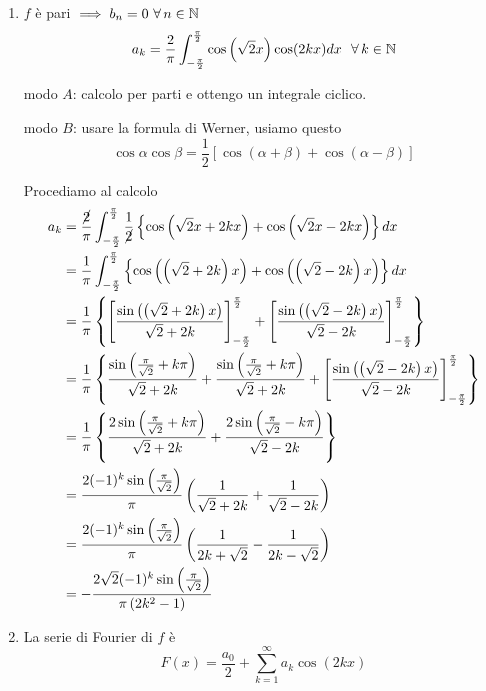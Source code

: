 \begin{enumerate}
\item $f$ è pari $\implies b_{n} = 0\ \forall n\in \NN $
\begin{equation*}
a_{k} = \frac{2}{\pi}\int^{\frac{\pi}{2}}_{- \frac{\pi}{2}}\cos\left(\sqrt{2} x\right)\cos(2kx) dx\ \ \forall k\in \NN 
\end{equation*}

modo $A$: calcolo per parti e ottengo un integrale ciclico.

modo $B$: usare la formula di Werner, usiamo questo
\begin{equation*}
\cos \alpha \cos \beta = \frac{1}{2}[\cos(\alpha + \beta) + \cos(\alpha - \beta)]
\end{equation*}

Procediamo al calcolo
\begin{align*}
a_{k} & = \frac{\cancel{2}}{\pi}\int^{\frac{\pi}{2}}_{- \frac{\pi}{2}}\frac{1}{\cancel{2}}\left\{\cos\left(\sqrt{2} x + 2kx\right) + \cos\left(\sqrt{2} x - 2kx\right)\right\} dx\\
 & = \frac{1}{\pi}\int^{\frac{\pi}{2}}_{- \frac{\pi}{2}}\left\{\cos\left(\left(\sqrt{2} + 2k\right) x\right) + \cos\left(\left(\sqrt{2} - 2k\right) x\right)\right\} dx\\
 & = \frac{1}{\pi}\left\{\left[\frac{\sin\left(\left(\sqrt{2} + 2k\right) x\right)}{\sqrt{2} + 2k}\right]^{\frac{\pi}{2}}_{- \frac{\pi}{2}} + \left[\frac{\sin\left(\left(\sqrt{2} - 2k\right) x\right)}{\sqrt{2} - 2k}\right]^{\frac{\pi}{2}}_{- \frac{\pi}{2}}\right\}\\
 & = \frac{1}{\pi}\left\{\frac{\sin\left(\frac{\pi}{\sqrt{2}} + k\pi \right)}{\sqrt{2} + 2k} + \frac{\sin\left(\frac{\pi}{\sqrt{2}} + k\pi \right)}{\sqrt{2} + 2k} + \left[\frac{\sin\left(\left(\sqrt{2} - 2k\right) x\right)}{\sqrt{2} - 2k}\right]^{\frac{\pi}{2}}_{- \frac{\pi}{2}}\right\}\\
 & = \frac{1}{\pi}\left\{\frac{2\sin\left(\frac{\pi}{\sqrt{2}} + k\pi \right)}{\sqrt{2} + 2k} + \frac{2\sin\left(\frac{\pi}{\sqrt{2}} - k\pi \right)}{\sqrt{2} - 2k}\right\}\\
 & = \frac{2(- 1)^{k}\sin\left(\frac{\pi}{\sqrt{2}}\right)}{\pi}\left(\frac{1}{\sqrt{2} + 2k} + \frac{1}{\sqrt{2} - 2k}\right)\\
 & = \frac{2(- 1)^{k}\sin\left(\frac{\pi}{\sqrt{2}}\right)}{\pi}\left(\frac{1}{2k + \sqrt{2}} - \frac{1}{2k - \sqrt{2}}\right)\\
 & = - \frac{2\sqrt{2}(- 1)^{k}\sin\left(\frac{\pi}{\sqrt{2}}\right)}{\pi \left(2k^{2} - 1\right)}
\end{align*}
\item La serie di Fourier di $f$ è
\begin{equation*}
F(x) = \frac{a_{0}}{2} + \sum\limits^{\infty}_{k = 1} a_{k}\cos(2kx)
\end{equation*}


\end{enumerate}
